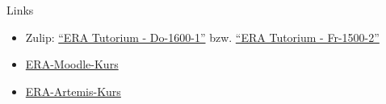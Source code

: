 \documentclass[
  german,            %
  aspectratio=169,    %
]{tumbeamer}
\begin{document}
\begin{frame}[c, fragile]{Links}{}
	\begin{itemize}
		\item Zulip: \href{https://zulip.in.tum.de/#narrow/stream/2661-ERA-Tutorium---Do-1600-1}{\enquote{ERA Tutorium - Do-1600-1}}
		      bzw. \href{https://zulip.in.tum.de/#narrow/stream/2675-ERA-Tutorium---Fr-1500-2 }{\enquote{ERA Tutorium - Fr-1500-2}}
		\item \href{https://www.moodle.tum.de/course/view.php?id=100633}{ERA-Moodle-Kurs}
		\item \href{https://artemis.in.tum.de/courses/401}{ERA-Artemis-Kurs}
	\end{itemize}
\end{frame}

\maketitle
\end{document}

